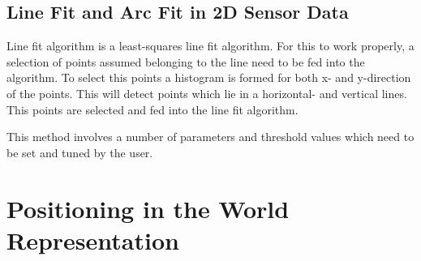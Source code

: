 \subsection{Line Fit and Arc Fit in 2D Sensor Data}
Line fit algorithm is a least-squares line fit algorithm. For this to work properly, a
selection of points assumed belonging to the line need to be fed into the algorithm. To
select this points a histogram is formed for both x- and y-direction of the points. This
will detect points which lie in a horizontal- and vertical lines. This points are selected
and fed into the line fit algorithm. 

This method involves a number of parameters and threshold values which need to be set and
tuned by the user. 



\section{Positioning in the World Representation}




